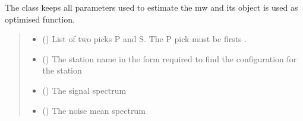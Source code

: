 \documentclass[letterpaper,10pt,english]{sphinxmanual}
\begin{document}
\begin{fulllineitems}
\label{\detokenize{api_support:amw.mw.parameters.MwFunctionParameters}}
\pysigstartsignatures
{}
\pysigstopsignatures
\sphinxAtStartPar
The class keeps all parameters used to estimate the mw and its object is used as optimised function.
\begin{quote}\begin{description}
\begin{itemize}
\item {} 
\sphinxAtStartPar
{} (\sphinxstyleliteralemphasis{\sphinxupquote{(}}\sphinxstyleliteralemphasis{\sphinxupquote{)}}) \textendash{} List of two picks P and S. The P pick must be firsts .

\item {} 
\sphinxAtStartPar
{} () \textendash{} The station name in the form required to find the configuration for the station

\item {} 
\sphinxAtStartPar
{} (\sphinxstyleliteralemphasis{\sphinxupquote{(}}\sphinxstyleliteralemphasis{\sphinxupquote{)}}) \textendash{} The signal spectrum

\item {} 
\sphinxAtStartPar
{} (\sphinxstyleliteralemphasis{\sphinxupquote{(}}\sphinxstyleliteralemphasis{\sphinxupquote{)}}) \textendash{} The noise mean spectrum


\end{itemize}
\end{description}
\end{quote}
\end{fulllineitems}
\end{document}
